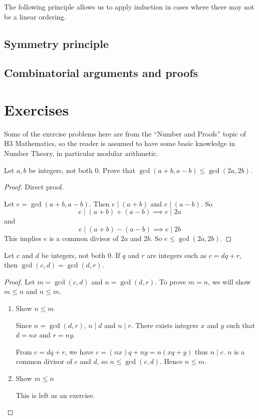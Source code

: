 The following principle allows us to apply induction in cases where there may not be a linear ordering.
\pagebreak

\subsection{Symmetry principle}

\subsection{Combinatorial arguments and proofs}
\pagebreak

\section*{Exercises}
Some of the exercise problems here are from the ``Number and Proofs'' topic of H3 Mathematics, so the reader is assumed to have some basic knowledge in Number Theory, in particular modular arithmetic.

\begin{prbm}
Let $a,b$ be integers, not both $0$. Prove that $\gcd(a+b,a-b)\le\gcd(2a,2b)$.
\end{prbm}

\begin{proof}
Direct proof.

Let $e=\gcd(a+b,a-b)$. Then $e\mid(a+b)$ and $e\mid(a-b)$. So
\[ e\mid(a+b)+(a-b) \implies e\mid 2a \]
and
\[ e\mid(a+b)-(a-b) \implies e\mid 2b \]
This implies $e$ is a common divisor of $2a$ and $2b$. So $e\le\gcd(2a,2b)$.
\end{proof}

\begin{prbm}
Let $c$ and $d$ be integers, not both $0$. If $q$ and $r$ are integers such as $c=dq+r$, then $\gcd(c,d)=\gcd(d,r)$.
\end{prbm}

\begin{proof}
Let $m=\gcd(c,d)$ and $n=\gcd(d,r)$. To prove $m=n$, we will show $m\le n$ and $n\le m$.

\begin{enumerate}[label=(\roman*)]
\item Show $n\le m$

Since $n=\gcd(d,r)$, $n\mid d$ and $n\mid r$. There exists integers $x$ and $y$ such that $d=nx$ and $r=ny$.

From $c=dq+r$, we have $c=(nx)q+ny=n(xq+y)$ thus $n\mid c$. $n$ is a common divisor of $c$ and $d$, so $n\le\gcd(c,d)$. Hence $n\le m$.

\item Show $m\le n$

This is left as an exercise.
\end{enumerate}
\end{proof}

